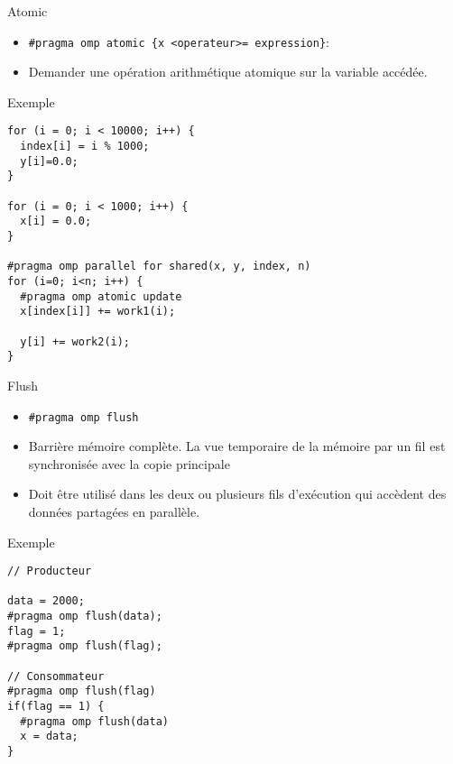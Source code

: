\documentclass[10pt]{beamer}
\begin{document}
\begin{frame}[fragile]{Atomic}

  \begin{itemize}
    \item \verb|#pragma omp atomic {x <operateur>= expression}|:

    \item Demander une opération arithmétique atomique sur la variable accédée.
  \end{itemize}
\end{frame}

\begin{frame}[fragile]{Exemple}

  \small
  \begin{verbatim}
for (i = 0; i < 10000; i++) {
  index[i] = i % 1000;
  y[i]=0.0;
}

for (i = 0; i < 1000; i++) {
  x[i] = 0.0;
}

#pragma omp parallel for shared(x, y, index, n)
for (i=0; i<n; i++) {
  #pragma omp atomic update
  x[index[i]] += work1(i);

  y[i] += work2(i);
}
  \end{verbatim}
\end{frame}

\begin{frame}[fragile]{Flush}

  \begin{itemize}
    \item \verb|#pragma omp flush|

    \item Barrière mémoire complète. La vue temporaire de la mémoire par un fil est synchronisée avec la copie principale

    \item Doit être utilisé dans les deux ou plusieurs fils d'exécution qui accèdent des données partagées en parallèle.
  \end{itemize}
\end{frame}

 \begin{frame}[fragile]{Exemple}

  \begin{verbatim}
// Producteur

data = 2000;
#pragma omp flush(data);
flag = 1;
#pragma omp flush(flag);

// Consommateur
#pragma omp flush(flag)
if(flag == 1) {
  #pragma omp flush(data)
  x = data;
}
  \end{verbatim}
\end{frame}
\end{document}
